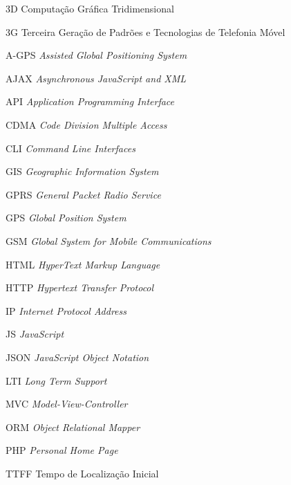 
\begin{siglas}
    \item[3D] Computação Gráfica Tridimensional
    \item[3G] Terceira Geração de Padrões e Tecnologias de Telefonia Móvel
    \item[A-GPS] \textit{Assisted Global Positioning System}
    \item[AJAX] \textit{Asynchronous JavaScript and XML}
    \item[API] \textit{Application Programming Interface}
    \item[CDMA] \textit{Code Division Multiple Access}
    \item[CLI] \textit{Command Line Interfaces}
    \item[GIS] \textit{Geographic Information System}
    \item[GPRS] \textit{General Packet Radio Service}
    \item[GPS] \textit{Global Position System}
    \item[GSM] \textit{Global System for Mobile Communications}
    \item[HTML] \textit{HyperText Markup Language}
    \item[HTTP] \textit{Hypertext Transfer Protocol}
    \item[IP] \textit{Internet Protocol Address}
    \item[JS] \textit{JavaScript}
    \item[JSON] \textit{JavaScript Object Notation}
    \item[LTI] \textit{Long Term Support}
    \item[MVC] \textit{Model-View-Controller}
    \item[ORM] \textit{Object Relational Mapper}
    \item[PHP] \textit{Personal Home Page}
    \item[TTFF] Tempo de Localização Inicial
\end{siglas}

